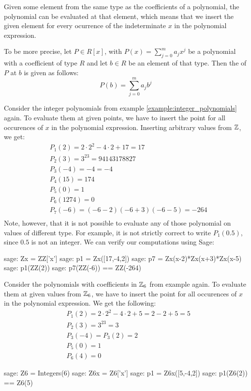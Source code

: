 Given some element from the same type as the coefficients of a polynomial, the polynomial can be evaluated at that element, which means that we insert the given element for every ocurrence of the indeterminate $x$ in the polynomial expression. 

To be more precise, let $P\in R[x]$, with $P(x)=\sum_{j=0}^m a_j x^j$ be a polynomial with a coefficient of type $R$ and let $b\in R$ be an element of that type. Then the  of $P$ at $b$ is given as follows:
\begin{equation}
P(b) = \sum_{j=0}^m a_j b^j
\end{equation}
\begin{example}Consider the integer polynomials from example \ref{example:integer_polynomials} again. To evaluate them at given points, we have to insert the point for all occurences of $x$ in the polynomial expression. Inserting arbitrary values from $\mathbb{Z}$, we get:
\begin{align*}
 &P_1(2)    = 2\cdot 2^2 -4\cdot 2 +17 = 17 \\
 &P_2(3)    = 3^{23}=94143178827 \\
 &P_3(-4)   = -4 = -4 \\
 &P_4(15)   = 174 \\
 &P_5(0)    = 1 \\
 &P_6(1274) =0 \\
 &P_7(-6)   = (-6-2)(-6+3)(-6-5) = -264 \\
\end{align*}
Note, however, that it is not possible to evaluate any of those polynomial on values of different type. For example, it is not strictly correct to write $P_1(0.5)$, since $0.5$ is not an integer. We can verify our computations using Sage:
\begin{sagecommandline}
sage: Zx = ZZ['x']
sage: p1 = Zx([17,-4,2])
sage: p7 = Zx(x-2)*Zx(x+3)*Zx(x-5)
sage: p1(ZZ(2))
sage: p7(ZZ(-6)) == ZZ(-264)
\end{sagecommandline}

\end{example}
\begin{example} Consider the polynomials with coefficients in $\mathbb{Z}_6$ from example \label{example:integer_mod_6_polynomials} again. To evaluate them at given values from $\mathbb{Z}_6$, we have to insert the point for all occurences of $x$ in the polynomial expression. We get the following:
\begin{align*}
 & P_1(2)= 2\cdot 2^2 -4\cdot 2 +5 = 2 - 2 + 5 = 5\\
 &P_2(3)= 3^{23}=3\\
 &P_3(-4)= P_3(2) = 2\\
 &P_5(0)= 1\\
 &P_6(4)=0
\end{align*}
\begin{sagecommandline}
sage: Z6 = Integers(6)
sage: Z6x = Z6['x']
sage: p1 = Z6x([5,-4,2])
sage: p1(Z6(2)) == Z6(5)
\end{sagecommandline}

\end{example}
